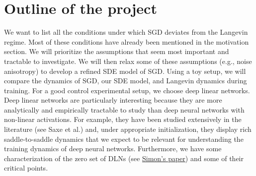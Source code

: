 \documentclass[11pt]{article}
\begin{document}
\section*{Outline of the project}
We want to list all the conditions under which SGD deviates from the Langevin regime. Most of these conditions have already been mentioned in the motivation section. We will prioritize the assumptions that seem most important and tractable to investigate. We will then relax some of these assumptions (e.g., noise anisotropy) to develop a refined SDE model of SGD. Using a toy setup, we will compare the dynamics of SGD, our SDE model, and Langevin dynamics during training.
For a good control experimental setup, we choose deep linear networks. Deep linear networks are particularly interesting because they are more analytically and empirically tractable to study than deep neural networks with non-linear activations. For example, they have been studied extensively in the literature (see Saxe et al.) and, under appropriate initialization, they display rich saddle-to-saddle dynamics that we expect to be relevant for understanding the training dynamics of deep neural networks. Furthermore, we have some characterization of the zero set of DLNs (see \href{https://arxiv.org/abs/2411.19920}{Simon's paper}) and some of their critical points.
\end{document}
